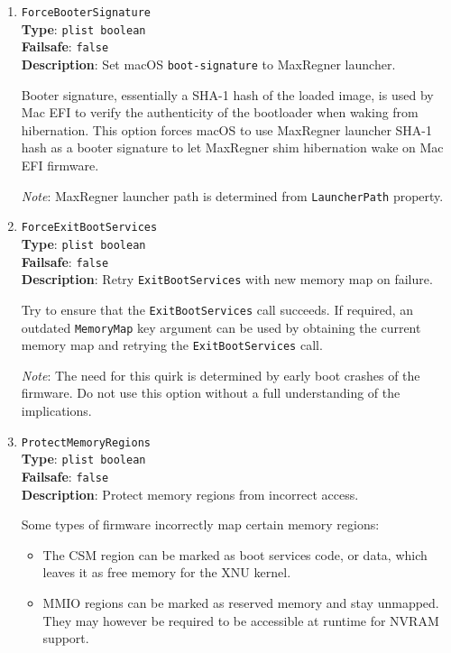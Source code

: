 \documentclass[]{article}
\providecommand{\tightlist}{%
  \setlength{\itemsep}{0pt}\setlength{\parskip}{0pt}}
\begin{document}
\begin{enumerate}
\item
  \texttt{ForceBooterSignature}\\
  \textbf{Type}: \texttt{plist\ boolean}\\
  \textbf{Failsafe}: \texttt{false}\\
  \textbf{Description}: Set macOS \texttt{boot-signature} to MaxRegner launcher.

  Booter signature, essentially a SHA-1 hash of the loaded image, is used by Mac EFI
  to verify the authenticity of the bootloader when waking from hibernation. This
  option forces macOS to use MaxRegner launcher SHA-1 hash as a booter signature to let
  MaxRegner shim hibernation wake on Mac EFI firmware.

  \emph{Note}: MaxRegner launcher path is determined from \texttt{LauncherPath} property.

\item
  \texttt{ForceExitBootServices}\\
  \textbf{Type}: \texttt{plist\ boolean}\\
  \textbf{Failsafe}: \texttt{false}\\
  \textbf{Description}: Retry \texttt{ExitBootServices} with new memory map on failure.

  Try to ensure that the \texttt{ExitBootServices} call succeeds. If required, an
  outdated \texttt{MemoryMap} key argument can be used by obtaining the current
  memory map and retrying the \texttt{ExitBootServices} call.

  \emph{Note}: The need for this quirk is determined by early boot crashes of the
  firmware. Do not use this option without a full understanding of the implications.

\item
  \texttt{ProtectMemoryRegions}\\
  \textbf{Type}: \texttt{plist\ boolean}\\
  \textbf{Failsafe}: \texttt{false}\\
  \textbf{Description}: Protect memory regions from incorrect access.

  Some types of firmware incorrectly map certain memory regions:

  \begin{itemize}
    \tightlist
    \item The CSM region can be marked as boot services code, or data, which
      leaves it as free memory for the XNU kernel.
    \item MMIO regions can be marked as reserved memory and stay unmapped.
      They may however be required to be accessible at runtime for NVRAM support.
  \end{itemize}


\end{enumerate}
\end{document}
